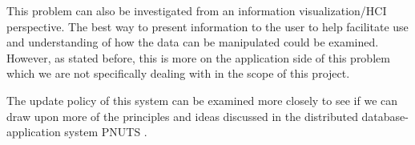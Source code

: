 \documentclass[12pt]{article}
\begin{document}
This problem can also be investigated from an information visualization/HCI perspective. The best way to present information to the user to help facilitate use and understanding of how the data can be manipulated could be examined. However, as stated before, this is more on the application side of this problem which we are not specifically dealing with in the scope of this project. 

The update policy of this system can be examined more closely to see if we can draw upon more of the principles and ideas discussed in the distributed database-application system PNUTS \cite{agrawal1997efficient}.



\end{document}
